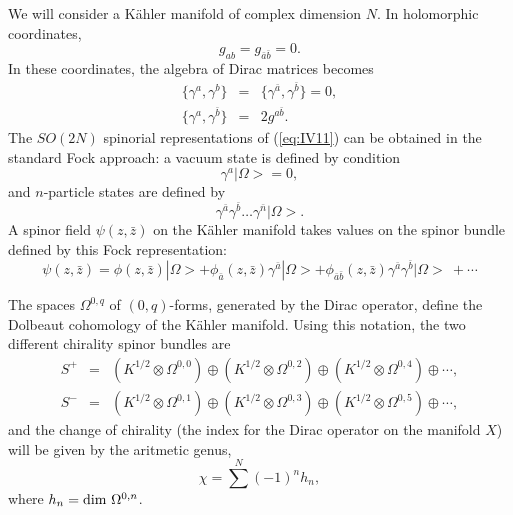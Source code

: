 We will consider a K\"ahler manifold of
complex dimension $N$. In holomorphic coordinates,
\begin{equation}
g_{ab}=g_{\bar{a}\bar{b}}=0.
\label{eq:IV10}
\end{equation}
In these coordinates, the algebra of Dirac matrices becomes 
\begin{eqnarray}
\{\gamma^{a},\gamma^{b}\} & = &
\{\gamma^{\bar{a}},\gamma^{\bar{b}}\}=0, \nonumber \\
\{\gamma^{a},\gamma^{\bar{b}}\} & = & 2 g^{a \bar{b}}.
\label{eq:IV11}
\end{eqnarray}
The $SO(2N)$ spinorial representations of (\ref{eq:IV11}) can be
obtained in the standard Fock approach: a vacuum state is defined
by condition 
\begin{equation}
\gamma^{a} |\Omega> = 0,
\label{eq:IV12}
\end{equation}
and $n$-particle states are defined by
\begin{equation}
\gamma^{\bar{a}}\gamma^{\bar{b}} \ldots \gamma^{\bar{n}}
|\Omega>.
\label{eq:IV13}
\end{equation}
A spinor field $\psi(z,\bar{z})$ on the K\"ahler manifold takes
values on the spinor bundle defined by this Fock representation:
\begin{equation}
\psi(z,\bar{z}) = \phi(z,\bar{z}) |\Omega> + \phi_{\bar{a}}
(z,\bar{z}) \gamma^{\bar{a}} |\Omega> +
\phi_{\bar{a}\bar{b}}(z,\bar{z}) \gamma^{\bar{a}}
\gamma^{\bar{b}} |\Omega> \ + \cdots
\label{eq:IV14}
\end{equation}
  
The spaces $\Omega^{0,q}$ of $(0,q)$-forms, 
generated by the Dirac operator, define the Dolbeaut cohomology of the K\"ahler manifold.
Using this notation, the two different chirality spinor bundles
are 
\begin{eqnarray}
S^+ & = & (K^{1/2} \otimes \Omega^{0,0}) \oplus (K^{1/2} \otimes
\Omega^{0,2}) \oplus (K^{1/2} \otimes \Omega^{0,4}) \oplus
\cdots, \nonumber \\
S^- & = & (K^{1/2} \otimes \Omega^{0,1}) \oplus (K^{1/2} \otimes
\Omega^{0,3}) \oplus (K^{1/2} \otimes \Omega^{0,5}) \oplus
\cdots, 
\label{eq:IV18}
\end{eqnarray}
and the change of chirality (the index for the Dirac operator on
the manifold $X$) will be given by the aritmetic genus,
\begin{equation}
\chi = \sum^{N} (-1)^n h_n,
\label{eq:IV19}
\end{equation}
where $h_n= \hbox {dim }\Omega^{0,n}$.
  
